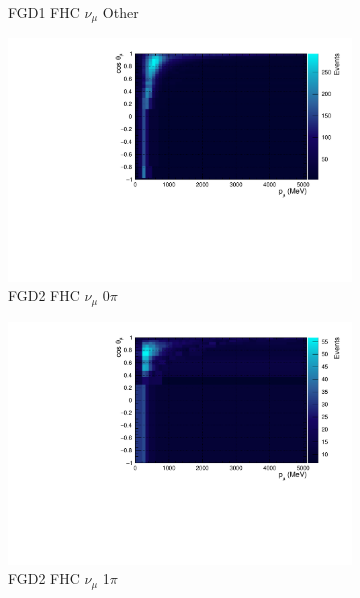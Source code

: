 \begin{figure}
\begin{subfigure}{.32\textwidth}
  \caption{FGD1 FHC $\nu_{\mu}$ Other}
  \label{fig:th2polyFGD1_numuCC_other}
\end{subfigure}
\centering
\begin{subfigure}{.32\textwidth}
  \centering
  \includegraphics[width=0.95\linewidth]{figs/TH2Poly_MC_FGD2_numuCC_0pi}
  \caption{FGD2 FHC $\nu_{\mu}$ 0$\pi$}
  \label{fig:th2polyFGD2_numuCC_0pi}
\end{subfigure}
\begin{subfigure}{.32\textwidth}
  \centering
  \includegraphics[width=0.95\linewidth]{figs/TH2Poly_MC_FGD2_numuCC_1pi}
  \caption{FGD2 FHC $\nu_{\mu}$ 1$\pi$}
  \label{fig:th2polyFGD2_numuCC_1pi}
\end{subfigure}
\begin{subfigure}{.32\textwidth}
  \centering

\end{subfigure}
\end{figure}
